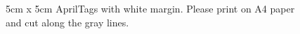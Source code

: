 \documentclass{article}
\begin{document}
\setlength{\fboxsep}{0pt}
\setlength{\fboxrule}{0.5pt}

\begin{figure}[htbp]
    \centering
    \caption{5cm x 5cm AprilTags with white margin. Please print on A4 paper and cut along the gray lines.}
\end{figure}
\end{document}
